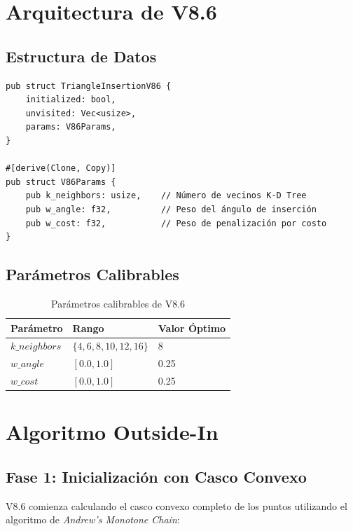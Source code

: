 \documentclass[12pt, a4paper]{article}
\begin{document}
\section{Arquitectura de V8.6}

\subsection{Estructura de Datos}

\begin{lstlisting}[style=rust, caption=Estructura principal de V8.6]
pub struct TriangleInsertionV86 {
    initialized: bool,
    unvisited: Vec<usize>,
    params: V86Params,
}

#[derive(Clone, Copy)]
pub struct V86Params {
    pub k_neighbors: usize,    // Número de vecinos K-D Tree
    pub w_angle: f32,          // Peso del ángulo de inserción
    pub w_cost: f32,           // Peso de penalización por costo
}
\end{lstlisting}

\subsection{Parámetros Calibrables}

\begin{table}[h]
\centering
\begin{tabular}{lll}
\toprule
\textbf{Parámetro} & \textbf{Rango} & \textbf{Valor Óptimo} \\
\midrule
$k\_neighbors$ & $\{4, 6, 8, 10, 12, 16\}$ & 8 \\
$w\_angle$ & $[0.0, 1.0]$ & 0.25 \\
$w\_cost$ & $[0.0, 1.0]$ & 0.25 \\
\bottomrule
\end{tabular}
\caption{Parámetros calibrables de V8.6}
\label{tab:params}
\end{table}

\section{Algoritmo Outside-In}

\subsection{Fase 1: Inicialización con Casco Convexo}

V8.6 comienza calculando el casco convexo completo de los puntos utilizando el algoritmo de \textit{Andrew's Monotone Chain}:
\end{document}
